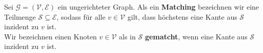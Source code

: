 \begin{definition}[Matching]\label{def:matching}
Sei $\mathcal{G} = (\mathcal{V}, \mathcal{E})$ ein ungerichteter Graph.
Als ein \textbf{Matching} bezeichnen wir eine Teilmenge $\mathcal{S} \subseteq \mathcal{E}$,
sodass für alle $v \in \mathcal{V}$ gilt, dass höchstens eine Kante 
aus $\mathcal{S}$ inzident zu $v$ ist.\\
Wir bezeichnen einen Knoten $v \in \mathcal{V}$ als in $\mathcal{S}$ \textbf{gematcht},
wenn eine Kante aus $\mathcal{S}$ inzident zu $v$ ist.
\end{definition}
